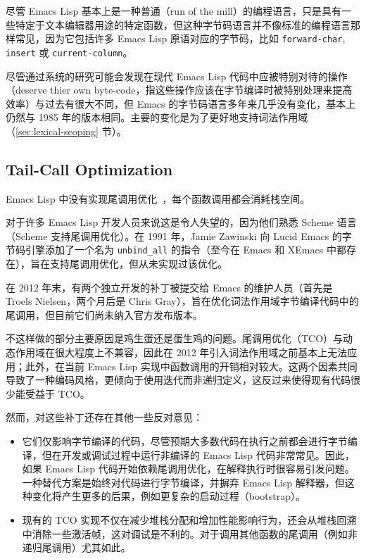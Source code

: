 \documentclass[format=acmsmall,screen]{acmart}
\begin{document}
尽管 Emacs Lisp 基本上是一种普通（run of the mill）的编程语言，只是具有一些特定于文本编辑器用途的特定函数，但这种字节码语言并不像标准的编程语言那样常见，因为它包括许多 Emacs Lisp 原语对应的字节码，比如 \texttt{forward-char}, \texttt{insert} 或 \texttt{current-column}。

尽管通过系统的研究可能会发现在现代 Emacs Lisp 代码中应被特别对待的操作（deserve thier own byte-code，指这些操作应该在字节编译时被特别处理来提高效率）与过去有很大不同，但 Emacs 的字节码语言多年来几乎没有变化，基本上仍然与 1985 年的版本相同。主要的变化是为了更好地支持词法作用域（\ref{sec:lexical-scoping} 节）。

\subsection{Tail-Call Optimization}
\label{sec:tco}

Emacs Lisp 中没有实现尾调用优化~\cite{Clinger1998}，每个函数调用都会消耗栈空间。

对于许多 Emacs Lisp 开发人员来说这是令人失望的，因为他们熟悉 Scheme 语言（Scheme 支持尾调用优化）。在 1991 年，Jamie Zawinski 向 Lucid Emacs 的字节码引擎添加了一个名为 \texttt{unbind\_all} 的指令（至今在 Emacs 和 XEmacs 中都存在），旨在支持尾调用优化，但从未实现过该优化。


在 2012 年末，有两个独立开发的补丁被提交给 Emacs 的维护人员（首先是 Troels Nielsen，两个月后是 Chris Gray），旨在优化词法作用域字节编译代码中的尾调用，但目前它们尚未纳入官方发布版本。

不这样做的部分主要原因是鸡生蛋还是蛋生鸡的问题。尾调用优化（TCO）与动态作用域在很大程度上不兼容，因此在 2012 年引入词法作用域之前基本上无法应用；此外，在当前 Emacs Lisp 实现中函数调用的开销相对较大。这两个因素共同导致了一种编码风格，更倾向于使用迭代而非递归定义，这反过来使得现有代码很少能受益于 TCO。

然而，对这些补丁还存在其他一些反对意见：

\begin{itemize}
\item 它们仅影响字节编译的代码，尽管预期大多数代码在执行之前都会进行字节编译，但在开发或调试过程中运行非编译的 Emacs Lisp 代码非常常见。因此，如果 Emacs Lisp 代码开始依赖尾调用优化，在解释执行时很容易引发问题。一种替代方案是始终对代码进行字节编译，并摒弃 Emacs Lisp 解释器，但这种变化将产生更多的后果，例如更复杂的启动过程（bootstrap）。
\item 现有的 TCO 实现不仅在减少堆栈分配和增加性能影响行为，还会从堆栈回溯中消除一些激活帧，这对调试是不利的。对于调用其他函数的尾调用（例如非递归尾调用）尤其如此。
\end{itemize}
\end{document}
